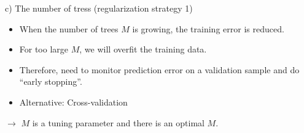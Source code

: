 \documentclass[
  10pt,
  ignorenonframetext,
]{beamer}
\providecommand{\tightlist}{%
  \setlength{\itemsep}{0pt}\setlength{\parskip}{0pt}}
\begin{document}
\begin{frame}
\begin{block}{c) The number of tress (regularization strategy 1)}
\protect\hypertarget{c-the-number-of-tress-regularization-strategy-1}{}
\(~\)

\begin{itemize}
\tightlist
\item
  When the number of trees \(M\) is growing, the training error is
  reduced.
\end{itemize}

\vspace{2mm}

\begin{itemize}
\tightlist
\item
  For too large \(M\), we will overfit the training data.
\end{itemize}

\vspace{2mm}

\begin{itemize}
\tightlist
\item
  Therefore, need to monitor prediction error on a validation sample and
  do ``early stopping''.
\end{itemize}

\vspace{2mm}

\begin{itemize}
\tightlist
\item
  Alternative: Cross-validation
\end{itemize}

\vspace{6mm}

\(\rightarrow\) \(M\) is a tuning parameter and there is an optimal
\(M\).
\end{block}
\end{frame}
\end{document}
